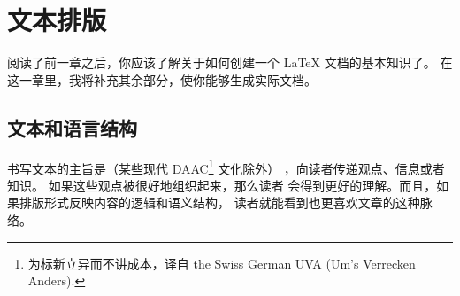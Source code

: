 

\chapter{文本排版}

\begin{intro}
阅读了前一章之后，你应该了解关于如何创建一个 \LaTeX{} 文档的基本知识了。
在这一章里，我将补充其余部分，使你能够生成实际文档。
\end{intro}


\section{文本和语言结构}
 \indent
书写文本的主旨是（某些现代 DAAC\footnote{为标新立异而不讲成本，译自 the
Swiss German UVA (Um's Verrecken Anders).} 文化除外）
，向读者传递观点、信息或者知识。
如果这些观点被很好地组织起来，那么读者
会得到更好的理解。而且，如果排版形式反映内容的逻辑和语义结构，
读者就能看到也更喜欢文章的这种脉络。

